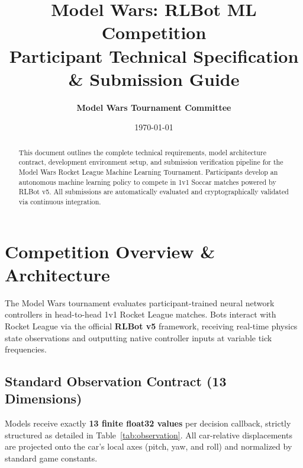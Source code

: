 \documentclass[11pt,a4paper]{article}
\title{
    \vspace{-1.5cm}
    \textbf{\Huge Model Wars: RLBot ML Competition} \\
    \Large Participant Technical Specification \& Submission Guide
}
\author{\textbf{Model Wars Tournament Committee}}
\date{\today}
\begin{document}
\maketitle

\begin{abstract}
This document outlines the complete technical requirements, model architecture contract, development environment setup, and submission verification pipeline for the Model Wars Rocket League Machine Learning Tournament. Participants develop an autonomous machine learning policy to compete in 1v1 Soccar matches powered by RLBot v5. All submissions are automatically evaluated and cryptographically validated via continuous integration.
\end{abstract}

\vspace{0.2cm}
\tableofcontents
\vspace{0.5cm}

\section{Competition Overview \& Architecture}

The Model Wars tournament evaluates participant-trained neural network controllers in head-to-head 1v1 Rocket League matches. Bots interact with Rocket League via the official \textbf{RLBot v5} framework, receiving real-time physics state observations and outputting native controller inputs at variable tick frequencies.

\subsection{Standard Observation Contract (13 Dimensions)}
Models receive exactly \textbf{13 finite float32 values} per decision callback, strictly structured as detailed in Table~\ref{tab:observation}. All car-relative displacements are projected onto the car's local axes (pitch, yaw, and roll) and normalized by standard game constants.
\end{document}
